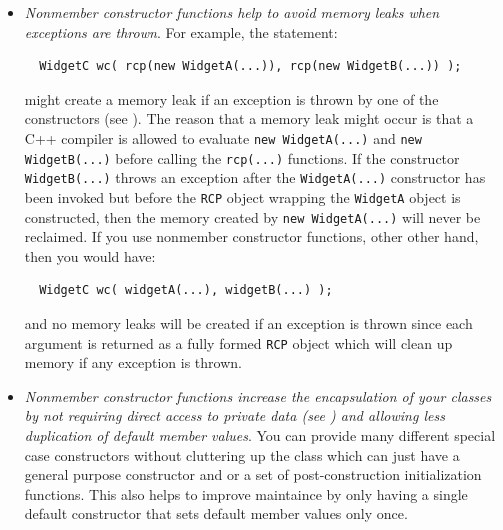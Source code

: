 \documentclass[pdf,ps2pdf,11pt]{SANDreport}
\begin{document}
\begin{itemize}
{}\item\textit{Nonmember constructor functions help to avoid memory leaks when
exceptions are thrown}.  For example, the statement:

{\small\begin{verbatim}
  WidgetC wc( rcp(new WidgetA(...)), rcp(new WidgetB(...)) );
\end{verbatim}}

might create a memory leak if an exception is thrown by one of the
constructors (see {}\cite[Item 13]{C++CodingStandards05}).  The reason that a
memory leak might occur is that a C++ compiler is allowed to evaluate
{}\texttt{new WidgetA(...)} and {}\texttt{new WidgetB(...)} before calling the
{}\texttt{rcp(...)} functions.  If the constructor {}\texttt{WidgetB(...)} 
throws an exception after the {}\texttt{WidgetA(...)} constructor has been
invoked but before the {}\texttt{RCP} object wrapping the {}\texttt{WidgetA}
object is constructed, then the memory created by {}\texttt{new WidgetA(...)} 
will never be reclaimed.  If you use nonmember constructor functions, other
other hand, then you would have:

{\small\begin{verbatim}
  WidgetC wc( widgetA(...), widgetB(...) );
\end{verbatim}}

and no memory leaks will be created if an exception is thrown since each
argument is returned as a fully formed {}\texttt{RCP} object which will clean
up memory if any exception is thrown.

{}\item\textit{Nonmember constructor functions increase the encapsulation of
your classes by not requiring direct access to private data (see {}\cite[Item
44]{C++CodingStandards05}) and allowing less duplication of default member
values}.  You can provide many different special case constructors without
cluttering up the class which can just have a general purpose constructor and
or a set of post-construction initialization functions.  This also helps to
improve maintaince by only having a single default constructor that sets
default member values only once.



\end{itemize}
\end{document}
